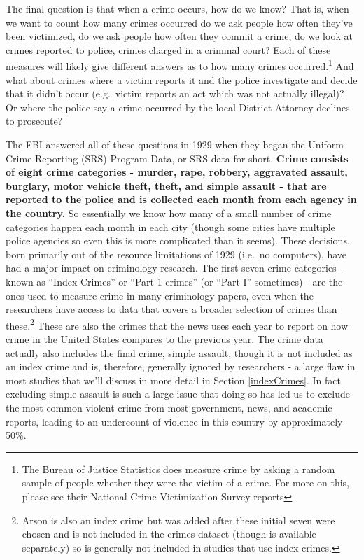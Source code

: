 \documentclass[
]{krantz}
\begin{document}
The final question is that when a crime occurs, how do we
know? That is, when we want to count how many crimes
occurred do we ask people how often they've been victimized,
do we ask people how often they commit a crime, do we look
at crimes reported to police, crimes charged in a criminal
court? Each of these measures will likely give different
answers as to how many crimes
occurred.\footnote{The Bureau of Justice Statistics does measure crime by asking a random sample of people whether they were the victim of a crime. For more on this, please see their National Crime Victimization Survey reports}
And what about crimes where a victim reports it and the
police investigate and decide that it didn't occur
(e.g.~victim reports an act which was not actually illegal)?
Or where the police say a crime occurred by the local
District Attorney declines to prosecute?

The FBI answered all of these questions in 1929 when they
began the Uniform Crime Reporting (SRS) Program Data, or SRS
data for short. \textbf{Crime consists of eight crime
categories - murder, rape, robbery, aggravated assault,
burglary, motor vehicle theft, theft, and simple assault -
that are reported to the police and is collected each month
from each agency in the country.} So essentially we know how
many of a small number of crime categories happen each month
in each city (though some cities have multiple police
agencies so even this is more complicated than it seems).
These decisions, born primarily out of the resource
limitations of 1929 (i.e.~no computers), have had a major
impact on criminology research. The first seven crime
categories - known as ``Index Crimes'' or ``Part 1 crimes''
(or ``Part I'' sometimes) - are the ones used to measure
crime in many criminology papers, even when the researchers
have access to data that covers a broader selection of
crimes than these.\footnote{Arson is also an index crime but
  was added after these initial seven were chosen and is not
  included in the crimes dataset (though is available
  separately) so is generally not included in studies that
  use index crimes.} These are also the crimes that the news
uses each year to report on how crime in the United States
compares to the previous year. The crime data actually also
includes the final crime, simple assault, though it is not
included as an index crime and is, therefore, generally
ignored by researchers - a large flaw in most studies that
we'll discuss in more detail in Section \ref{indexCrimes}.
In fact excluding simple assault is such a large issue that
doing so has led us to exclude the most common violent crime
from most government, news, and academic reports, leading to
an undercount of violence in this country by approximately
50\%.
\end{document}
